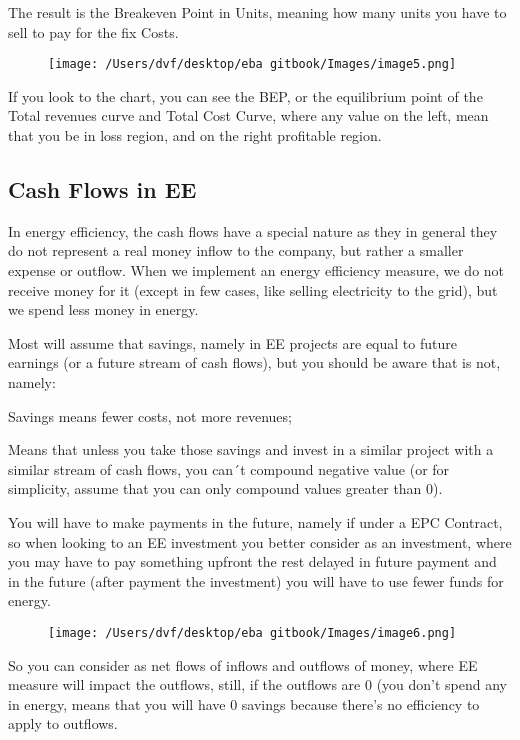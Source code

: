 \documentclass[]{book}
\theoremstyle{definition}
\theoremstyle{definition}
\theoremstyle{definition}
\theoremstyle{remark}
\begin{document}
The result is the Breakeven Point in Units, meaning how many units you
have to sell to pay for the fix Costs.

\begin{figure}[htbp]
\centering
\texttt{[image: /Users/dvf/desktop/eba gitbook/Images/image5.png]}
\caption{}
\end{figure}

If you look to the chart, you can see the BEP, or the equilibrium point
of the Total revenues curve and Total Cost Curve, where any value on the
left, mean that you be in loss region, and on the right profitable
region.

\subsection{Cash Flows in EE}\label{cash-flows-in-ee}

In energy efficiency, the cash flows have a special nature as they in
general they do not represent a real money inflow to the company, but
rather a smaller expense or outflow. When we implement an energy
efficiency measure, we do not receive money for it (except in few cases,
like selling electricity to the grid), but we spend less money in
energy.

Most will assume that savings, namely in EE projects are equal to future
earnings (or a future stream of cash flows), but you should be aware
that is not, namely:

Savings means fewer costs, not more revenues;

Means that unless you take those savings and invest in a similar project
with a similar stream of cash flows, you can´t compound negative value
(or for simplicity, assume that you can only compound values greater
than 0).

You will have to make payments in the future, namely if under a EPC
Contract, so when looking to an EE investment you better consider as an
investment, where you may have to pay something upfront the rest delayed
in future payment and in the future (after payment the investment) you
will have to use fewer funds for energy.

\begin{figure}[htbp]
\centering
\texttt{[image: /Users/dvf/desktop/eba gitbook/Images/image6.png]}
\caption{}
\end{figure}

So you can consider as net flows of inflows and outflows of money, where
EE measure will impact the outflows, still, if the outflows are 0 (you
don't spend any in energy, means that you will have 0 savings because
there's no efficiency to apply to outflows.
\end{document}
